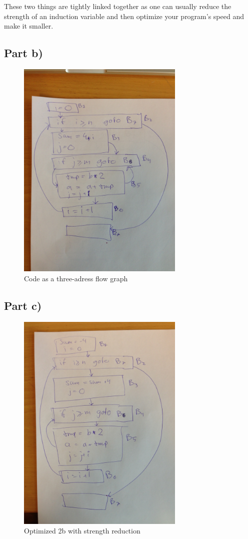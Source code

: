 \documentclass[paper=a4, fontsize=11pt]{scrartcl} %
\numberwithin{equation}{section} %
\numberwithin{figure}{section} %
\numberwithin{table}{section} %
\begin{document}
These two things are tightly linked together as one can usually reduce the strength of an induction variable and then optimize your program's speed and make it smaller.

\newpage
\subsection{Part b)}
\begin{figure}[ht!]
\centering
\includegraphics[width=80mm]{2b.jpg}
\caption{Code as a three-adress flow graph}
\label{fig:2b}
\end{figure}

\newpage
\subsection{Part c)}
\begin{figure}[ht!]
\centering
\includegraphics[width=80mm]{2c.jpg}
\caption{Optimized 2b with strength reduction}
\label{fig:2c}
\end{figure}
\end{document}
